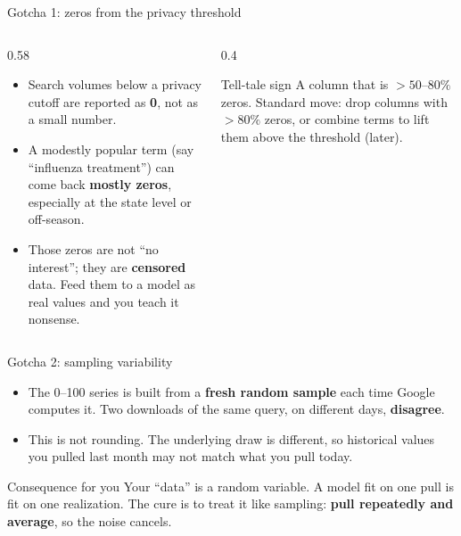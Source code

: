 \documentclass[aspectratio=169,11pt]{beamer}
\begin{document}
\begin{frame}{Gotcha 1: zeros from the privacy threshold}
  \begin{columns}[T]
    \begin{column}{0.58\textwidth}
      \begin{itemize}
        \item Search volumes below a privacy cutoff are reported as \textbf{0}, not as a
              small number.
        \item A modestly popular term (say ``influenza treatment'') can come back
              \textbf{mostly zeros}, especially at the state level or off-season.
        \item Those zeros are not ``no interest''; they are \textbf{censored} data. Feed
              them to a model as real values and you teach it nonsense.
      \end{itemize}
    \end{column}
    \begin{column}{0.4\textwidth}
      \begin{block}{Tell-tale sign}
        A column that is $>50$--$80\%$ zeros. Standard move: drop columns with
        $>80\%$ zeros, or combine terms to lift them above the threshold (later).
      \end{block}
    \end{column}
  \end{columns}
\end{frame}

\begin{frame}{Gotcha 2: sampling variability}
  \begin{itemize}
    \item The 0--100 series is built from a \textbf{fresh random sample} each time Google
          computes it. Two downloads of the same query, on different days, \textbf{disagree}.
    \item This is not rounding. The underlying draw is different, so historical values you
          pulled last month may not match what you pull today.
  \end{itemize}
  \vspace{0.4em}
  \begin{block}{Consequence for you}
    Your ``data'' is a random variable. A model fit on one pull is fit on one realization.
    The cure is to treat it like sampling: \textbf{pull repeatedly and average}, so the
    noise cancels.
  \end{block}
\end{frame}
\end{document}
